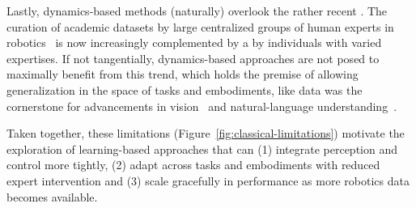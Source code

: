 Lastly, dynamics-based methods (naturally) overlook the rather recent . 
The curation of academic datasets by large centralized groups of human experts in robotics~\citep{OpenXEmbodimentRobotic,DROIDLargeScaleIntheWild,agibot-world-contributorsAgiBotWorldColosseo2025} is now increasingly complemented by a  by individuals with varied expertises.
If not tangentially, dynamics-based approaches are not posed to maximally benefit from this trend, which holds the premise of allowing generalization in the space of tasks and embodiments, like data was the cornerstone for advancements in vision~\citep{alayracFlamingoVisualLanguage2022} and natural-language understanding~\citep{brownLanguageModelsAre2020}.

Taken together, these limitations (Figure~\ref{fig:classical-limitations}) motivate the exploration of learning-based approaches that can (1) integrate perception and control more tightly, (2) adapt across tasks and embodiments with reduced expert intervention and (3) scale gracefully in performance as more robotics data becomes available.